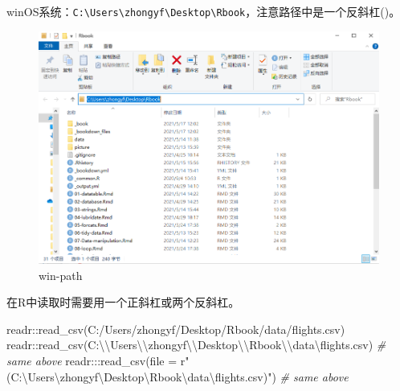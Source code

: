 \documentclass[
]{book}
\newenvironment{Shaded}{\begin{snugshade}}{\end{snugshade}}
\newcommand{\AttributeTok}[1]{\textcolor[rgb]{0.77,0.63,0.00}{#1}}
\newcommand{\CommentTok}[1]{\textcolor[rgb]{0.56,0.35,0.01}{\textit{#1}}}
\newcommand{\FunctionTok}[1]{\textcolor[rgb]{0.00,0.00,0.00}{#1}}
\newcommand{\NormalTok}[1]{#1}
\newcommand{\SpecialCharTok}[1]{\textcolor[rgb]{0.00,0.00,0.00}{#1}}
\newcommand{\StringTok}[1]{\textcolor[rgb]{0.31,0.60,0.02}{#1}}
\begin{document}
winOS系统：\texttt{C:\textbackslash{}Users\textbackslash{}zhongyf\textbackslash{}Desktop\textbackslash{}Rbook}，注意路径中是一个反斜杠()。

\begin{figure}
\centering
\includegraphics{picture/read-write/win-path.png}
\caption{win-path}
\end{figure}

在R中读取时需要用一个正斜杠或两个反斜杠。

\begin{Shaded}
\begin{Highlighting}[]
\NormalTok{readr}\SpecialCharTok{::}\FunctionTok{read\_csv}\NormalTok{(}\StringTok{\textquotesingle{}C:/Users/zhongyf/Desktop/Rbook/data/flights.csv\textquotesingle{}}\NormalTok{)}
\NormalTok{readr}\SpecialCharTok{::}\FunctionTok{read\_csv}\NormalTok{(}\StringTok{\textquotesingle{}C:}\SpecialCharTok{\textbackslash{}\textbackslash{}}\StringTok{Users}\SpecialCharTok{\textbackslash{}\textbackslash{}}\StringTok{zhongyf}\SpecialCharTok{\textbackslash{}\textbackslash{}}\StringTok{Desktop}\SpecialCharTok{\textbackslash{}\textbackslash{}}\StringTok{Rbook}\SpecialCharTok{\textbackslash{}\textbackslash{}}\StringTok{data}\SpecialCharTok{\textbackslash{}f}\StringTok{lights.csv\textquotesingle{}}\NormalTok{) }\CommentTok{\# same above}
\NormalTok{readr}\SpecialCharTok{:::}\FunctionTok{read\_csv}\NormalTok{(}\AttributeTok{file =}\NormalTok{ r}\StringTok{"(C:\textbackslash{}Users\textbackslash{}zhongyf\textbackslash{}Desktop\textbackslash{}Rbook\textbackslash{}data}\SpecialCharTok{\textbackslash{}f}\StringTok{lights.csv)"}\NormalTok{) }\CommentTok{\# same above}
\end{Highlighting}
\end{Shaded}
\end{document}
